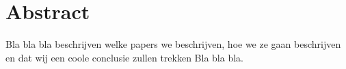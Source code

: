 \section*{Abstract}
Bla bla bla beschrijven welke papers we beschrijven, hoe we ze gaan beschrijven en dat wij een coole conclusie zullen trekken Bla bla bla.
